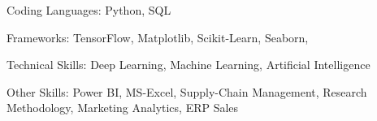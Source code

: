\documentclass[11pt]{spidercv}
\begin{document}
    \begin{SideBar}{\ColorBackground}{\ColorTextSide}
        
        
        
        \vspace*{1cm}

        \begin{ItemList}{\ColorHighlight}
            \item [Coding Languages:] Python, SQL
            \item [ Frameworks:] TensorFlow, 
              Matplotlib, Scikit-Learn, 
              Seaborn,  
            \item [Technical Skills:]  Deep Learning, Machine Learning, Artificial Intelligence
            \item [Other Skills: ]   Power BI, MS-Excel, Supply-Chain 
Management, Research Methodology, Marketing 
Analytics, ERP Sales 

        \end{ItemList}

        \vspace*{1cm}

    

        \begin{SpiderDiagram}{\ColorTextSide}{\ColorHighlight}
        
        
        \end{SpiderDiagram}

        \vspace*{1cm}


        \begin{SkillGauges}{\ColorHighlight}
    
        \end{SkillGauges}
    \end{SideBar}
\end{document}
